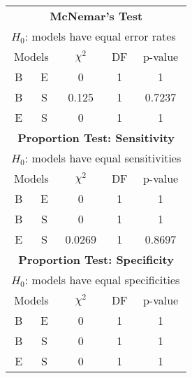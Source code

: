 \begin{table}[ht]
  \centering
  \begin{tabular}[t]{ c c c c c }
    \hline
    \multicolumn{5}{c}{\textbf{McNemar's Test}} \\
    \multicolumn{5}{l}{$H_0$: models have equal error rates} \\
    \hline
    \multicolumn{2}{c}{Models} & {\footnotesize $\chi^2$} & DF & p-value \\
    B & E & 0 & 1 & 1 \\
    B & S & 0.125 & 1 & 0.7237 \\
    E & S & 0 & 1 & 1 \\
    \hline
    \multicolumn{5}{c}{\textbf{Proportion Test: Sensitivity}} \\
    \multicolumn{5}{l}{$H_0$: models have equal sensitivities} \\
    \hline
    \multicolumn{2}{c}{Models} & {\footnotesize $\chi^2$} & DF & p-value \\
    B & E & 0 & 1 & 1 \\
    B & S & 0 & 1 & 1 \\
    E & S & 0.0269 & 1 & 0.8697 \\
    \hline
    \multicolumn{5}{c}{\textbf{Proportion Test: Specificity}} \\
    \multicolumn{5}{l}{$H_0$: models have equal specificities} \\
    \hline
    \multicolumn{2}{c}{Models} & {\footnotesize $\chi^2$} & DF & p-value \\
    B & E & 0 & 1 & 1 \\
    B & S & 0 & 1 & 1 \\
    E & S & 0 & 1 & 1 \\
    \hline
  \end{tabular}
\end{table}